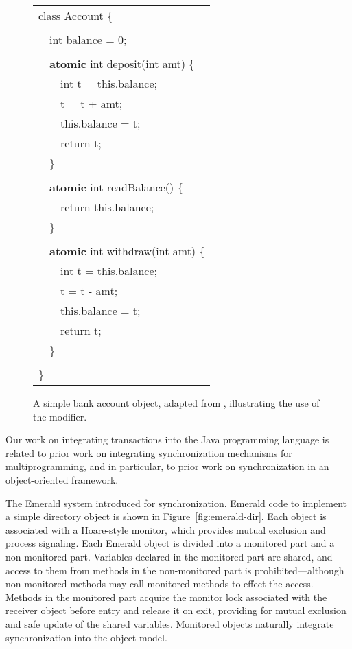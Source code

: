 \begin{figure}
{\ttfamily\sis\small%
\begin{tabular}{l}
class Account \{\\
\\
~~int balance = 0;\\
\\
~~{\bf atomic} int deposit(int amt) \{\\
~~~~int t = this.balance;\\
~~~~t = t + amt;\\
~~~~this.balance = t;\\
~~~~return t;\\
~~\}\\
\\
~~{\bf atomic} int readBalance() \{\\
~~~~return this.balance;\\
~~\}\\
\\
~~{\bf atomic} int withdraw(int amt) \{\\
~~~~int t = this.balance;\\
~~~~t = t - amt;\\
~~~~this.balance = t;\\
~~~~return t;\\
~~\}\\
\\
\}\\
\end{tabular}
}\vspace{.2in}
\caption[A simple bank account object
  illustrating the use of the \atomic modifier.]
 {A simple bank account object, adapted from \cite{FlanaganQa03},
  illustrating the use of the \atomic modifier.}
\label{fig:atomic}
\end{figure}

Our work on integrating transactions into the Java programming
language is related to prior work on integrating synchronization
mechanisms for multiprogramming, and in particular, to prior work on
synchronization in an object-oriented framework.

\label{sec:emerald}
The Emerald system \cite{BlackHuJuLe86,JulSt91} introduced
 for synchronization.  Emerald code to
implement a simple directory object is shown in
Figure~\ref{fig:emerald-dir}.  Each object is associated with a
Hoare-style monitor, which provides mutual exclusion and process
signaling.  Each Emerald object is divided into a monitored part and
a non-monitored part.  Variables declared in the monitored part are
shared, and access to them from methods in the non-monitored part is
prohibited---although non-monitored methods may call monitored methods
to effect the access.  Methods in the monitored part acquire the monitor lock
associated with the receiver object before entry and release it on
exit, providing for mutual exclusion and safe update of the shared
variables.  Monitored objects naturally integrate synchronization into
the object model.

